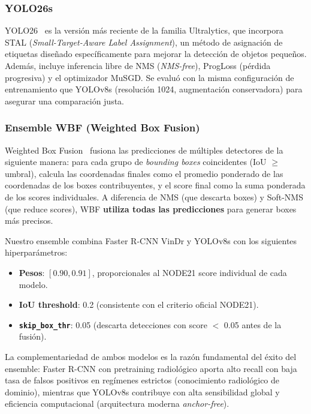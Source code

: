 \documentclass[conference]{IEEEtran}
\begin{document}
\subsubsection{YOLO26s}

YOLO26~\cite{yolo26} es la versi\'{o}n m\'{a}s reciente de la familia
Ultralytics, que incorpora STAL (\textit{Small-Target-Aware Label Assignment}),
un m\'{e}todo de asignaci\'{o}n de etiquetas dise\~{n}ado espec\'{i}ficamente
para mejorar la detecci\'{o}n de objetos peque\~{n}os. Adem\'{a}s, incluye
inferencia libre de NMS (\textit{NMS-free}), ProgLoss (p\'{e}rdida progresiva)
y el optimizador MuSGD. Se evalu\'{o} con la misma configuraci\'{o}n de
entrenamiento que YOLOv8s (resoluci\'{o}n 1024, augmentaci\'{o}n conservadora)
para asegurar una comparaci\'{o}n justa.

\subsubsection{Ensemble WBF (Weighted Box Fusion)}
\label{sec:wbf}

Weighted Box Fusion~\cite{solovyev2021} fusiona las predicciones de
m\'{u}ltiples detectores de la siguiente manera: para cada grupo de
\textit{bounding boxes} coincidentes (IoU $\geq$ umbral), calcula las
coordenadas finales como el promedio ponderado de las coordenadas de los
boxes contribuyentes, y el score final como la suma ponderada de los scores
individuales. A diferencia de NMS (que descarta boxes) y Soft-NMS (que reduce
scores), WBF \textbf{utiliza todas las predicciones} para generar boxes
m\'{a}s precisos.

Nuestro ensemble combina Faster R-CNN VinDr y YOLOv8s con los siguientes
hiperpar\'{a}metros:
\begin{itemize}
\item \textbf{Pesos}: $[0.90, 0.91]$, proporcionales al NODE21 score individual
de cada modelo.
\item \textbf{IoU threshold}: 0.2 (consistente con el criterio oficial NODE21).
\item \textbf{\texttt{skip\_box\_thr}}: 0.05 (descarta detecciones con score
$<$ 0.05 antes de la fusi\'{o}n).
\end{itemize}

La complementariedad de ambos modelos es la raz\'{o}n fundamental del
\'{e}xito del ensemble: Faster R-CNN con pretraining radiol\'{o}gico aporta
alto recall con baja tasa de falsos positivos en reg\'{i}menes estrictos
(conocimiento radiol\'{o}gico de dominio), mientras que YOLOv8s contribuye con
alta sensibilidad global y eficiencia computacional (arquitectura moderna
\textit{anchor-free}).
\end{document}
